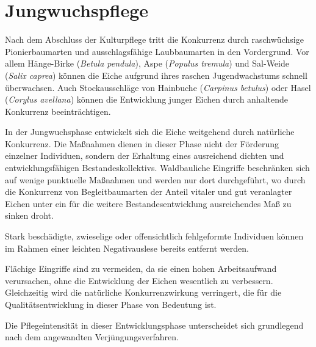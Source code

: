 \documentclass[twocolumn, bibliography=totoc, abstract=true]{scrartcl}
\begin{document}
\section{Jungwuchspflege}

Nach dem Abschluss der Kulturpflege tritt die Konkurrenz durch raschwüchsige Pionierbaumarten und ausschlagsfähige Laubbaumarten in den Vordergrund. Vor allem Hänge-Birke (\emph{Betula pendula}), Aspe (\emph{Populus tremula}) und Sal-Weide (\emph{Salix caprea}) können die Eiche aufgrund ihres raschen Jugendwachstums schnell überwachsen. Auch Stockausschläge von Hainbuche (\emph{Carpinus betulus}) oder Hasel (\emph{Corylus avellana}) können die Entwicklung junger Eichen durch anhaltende Konkurrenz beeinträchtigen.

In der Jungwuchsphase entwickelt sich die Eiche weitgehend durch natürliche Konkurrenz. Die Maßnahmen dienen in dieser Phase nicht der Förderung einzelner Individuen, sondern der Erhaltung eines ausreichend dichten und entwicklungsfähigen Bestandeskollektivs. Waldbauliche Eingriffe beschränken sich auf wenige punktuelle Maßnahmen und werden nur dort durchgeführt, wo durch die Konkurrenz von Begleitbaumarten der Anteil vitaler und gut veranlagter Eichen unter ein für die weitere Bestandesentwicklung ausreichendes Maß zu sinken droht.

Stark beschädigte, zwieselige oder offensichtlich fehlgeformte Individuen können im Rahmen einer leichten Negativauslese bereits entfernt werden. 

Flächige Eingriffe sind zu vermeiden, da sie einen hohen Arbeitsaufwand verursachen, ohne die Entwicklung der Eichen wesentlich zu verbessern. Gleichzeitig wird die natürliche Konkurrenzwirkung verringert, die für die Qualitätsentwicklung in dieser Phase von Bedeutung ist.

Die Pflegeintensität in dieser Entwicklungsphase unterscheidet sich grundlegend nach dem angewandten Verjüngungsverfahren.
\end{document}
